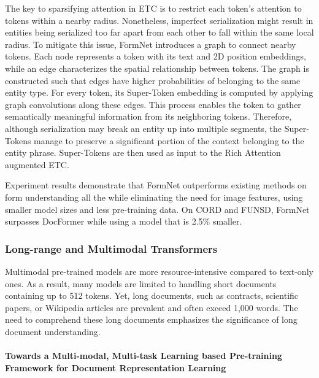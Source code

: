 The key to sparsifying attention in \ac{ETC} is to restrict each token's attention to tokens within a nearby radius. Nonetheless, imperfect serialization might result in entities being serialized too far apart from each other to fall within the same local radius. To mitigate this issue, FormNet introduces a graph to connect nearby tokens. Each node represents a token with its text and 2D position embeddings, while an edge characterizes the spatial relationship between tokens. The graph is constructed such that edges have higher probabilities of belonging to the same entity type. For every token, its Super-Token embedding is computed by applying graph convolutions along these edges. This process enables the token to gather semantically meaningful information from its neighboring tokens. Therefore, although serialization may break an entity up into multiple segments, the Super-Tokens manage to preserve a significant portion of the context belonging to the entity phrase. Super-Tokens are then used as input to the Rich Attention augmented \ac{ETC}. 

Experiment results demonstrate that FormNet outperforms existing methods on form understanding all the while eliminating the need for image features, using smaller model sizes and less pre-training data. On CORD and FUNSD, FormNet surpasses DocFormer while using a model that is 2.5\% smaller.


\subsubsection{Long-range and Multimodal Transformers}

Multimodal pre-trained models are more resource-intensive compared to text-only ones. As a result, many models are limited to handling short documents containing up to 512 tokens. Yet, long documents, such as contracts, scientific papers, or Wikipedia articles are prevalent and often exceed 1,000 words. The need to comprehend these long documents emphasizes the significance of long document understanding.


\paragraph{Towards a Multi-modal, Multi-task Learning based Pre-training Framework for Document Representation Learning} 

